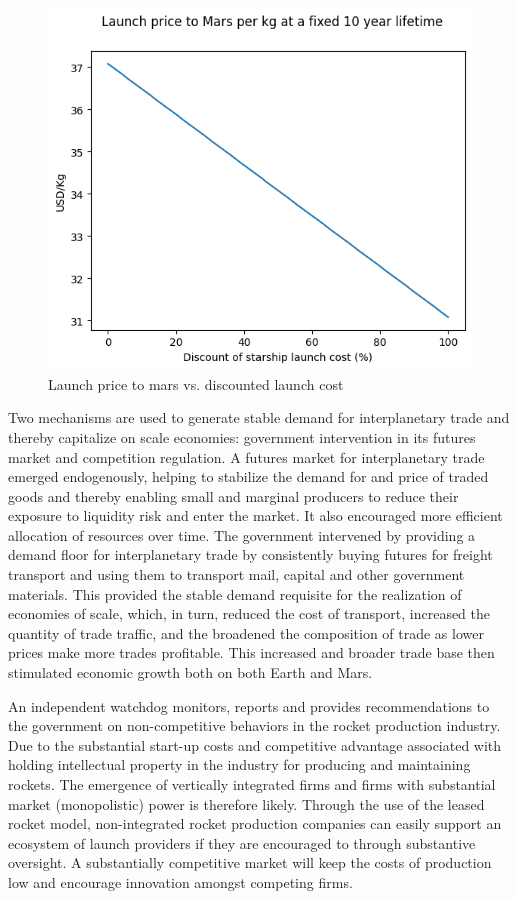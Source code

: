 \documentclass[fleqn,10pt]{Stylesheet} %
\begin{document}
\begin{figure}
    \centering
    \includegraphics[width=\linewidth]{fig_disclaunchflights.png}
    \caption{Launch price to mars vs. discounted launch cost}
    \label{fig:flight_cost_launch}
\end{figure}

Two mechanisms are used to generate stable demand for interplanetary trade and thereby capitalize on scale economies: government intervention in its futures market and competition regulation. A futures market for interplanetary trade emerged endogenously, helping to stabilize the demand for and price of traded goods and thereby enabling small and marginal producers to reduce their exposure to liquidity risk and enter the market. It also encouraged more efficient allocation of resources over time. The government intervened by providing a demand floor for interplanetary trade by consistently buying futures for freight transport and using them to transport mail, capital and other government materials. This provided the stable demand requisite for the realization of economies of scale, which, in turn, reduced the cost of transport, increased the quantity of trade traffic, and the broadened the composition of trade as lower prices make more trades profitable. This increased and broader trade base then stimulated economic growth both on both Earth and Mars.

An independent watchdog monitors, reports and provides recommendations to the government on non-competitive behaviors in the rocket production industry. Due to the substantial start-up costs and competitive advantage associated with holding intellectual property in the industry for producing and maintaining rockets. The emergence of vertically integrated firms and firms with substantial market (monopolistic) power is therefore likely. Through the use of the leased rocket model, non-integrated rocket production companies can easily support an ecosystem of launch providers if they are encouraged to through substantive oversight. A substantially competitive market will keep the costs of production low and encourage innovation amongst competing firms.
\end{document}
